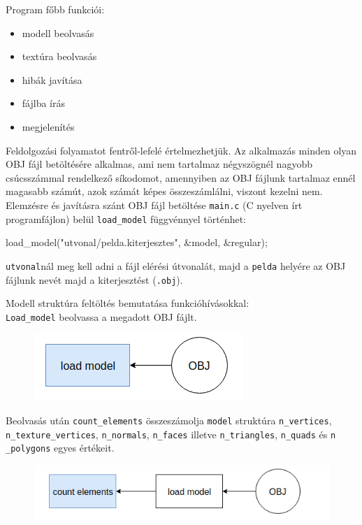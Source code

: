 Program főbb funkciói:
 \begin{itemize}
\item modell beolvasás
\item textúra beolvasás
\item hibák javítása
\item fájlba írás
\item megjelenítés
\end{itemize}
\bigskip
Feldolgozási folyamatot fentről-lefelé értelmezhetjük.
\newpage
{}
Az alkalmazás minden olyan OBJ fájl betöltésére alkalmas, ami nem tartalmaz négyszögnél nagyobb csúcsszámmal rendelkező síkodomot, amennyiben az OBJ fájlunk tartalmaz ennél magasabb számút, azok számát képes összeszámlálni, viszont kezelni nem.\\

Elemzésre és javításra szánt OBJ fájl betöltése \texttt{main.c} (C nyelven írt programfájlon) belül \texttt{load\_model} függvénnyel történhet:
\bigskip
\begin{cpp}
load_model("utvonal/pelda.kiterjesztes", &model, &regular);
\end{cpp}
\bigskip

\texttt{utvonal}nál meg kell adni a fájl elérési útvonalát, majd a \texttt{pelda} helyére az OBJ fájlunk nevét majd a kiterjesztést (\texttt{.obj}).
\bigskip

\noindent Modell struktúra feltöltés bemutatása funkcióhívásokkal:\\

\texttt{Load\_model} beolvassa a megadott OBJ fájlt.
\bigskip
\begin{figure}[h]
\centering
\includegraphics[scale=0.5]{images/load.png}
\end{figure}
\bigskip

Beolvasás után \texttt{count\_elements} összeszámolja \texttt{model} struktúra \texttt{n\_vertices},  \texttt{\\n\_texture\_vertices}, \texttt{n\_normals}, \texttt{n\_faces} illetve \texttt{n\_triangles}, \texttt{n\_quads} és \texttt{n\\\_polygons} egyes értékeit.
\bigskip
\begin{figure}[h]
\centering
\includegraphics[scale=0.5]{images/count.png}
\end{figure}
\bigskip

